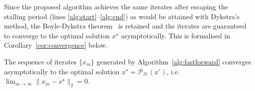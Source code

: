 Since the proposed algorithm achieves the same iterates after escaping the stalling period (lines \ref{alg:start}--\ref{alg:end}) as would be attained with Dykstra's method, the Boyle-Dykstra theorem~\cite{DYKSTRA} is retained and the iterates are guaranteed to converge to the optimal solution $x^\star$ asymptotically. This is formalised in Corollary~\ref{cor:convergence} below.

\begin{cor}
\label{cor:convergence}
The sequence of iterates $\{x_m\}$ generated by Algorithm~\ref{alg:fastforward} converges asymptotically to the optimal solution $x^\star = \mathcal{P}_{\mathcal{H}}(x^\circ)$, i.e.\ $\lim_{m\rightarrow\infty}\|x_m-x^\star\|_2=0$.
\end{cor}